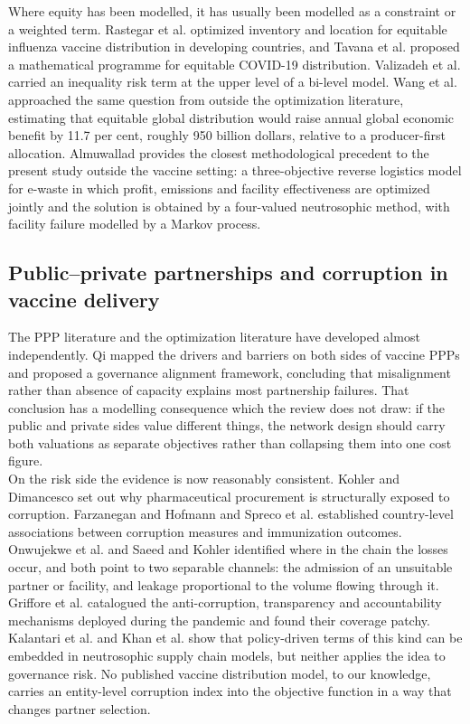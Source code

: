 \documentclass[a4paper]{elsarticle}
\begin{document}
{Where equity has been modelled, it has usually been modelled as a constraint or a weighted term. Rastegar et al. \cite{Rastegar:2021} optimized inventory and location for equitable influenza vaccine distribution in developing countries, and Tavana et al. \cite{Tavana:2021} proposed a mathematical programme for equitable COVID-19 distribution. Valizadeh et al. \cite{Valizadeh:2023} carried an inequality risk term at the upper level of a bi-level model. Wang et al. \cite{Wang:2023}  approached the same question from outside the optimization literature, estimating that equitable global distribution would raise annual global economic benefit by 11.7 per cent, roughly 950 billion dollars, relative to a producer-first allocation. Almuwallad \cite{Almuwallad:2026} provides the closest methodological precedent to the present study outside the vaccine setting: a three-objective reverse logistics model for e-waste in which profit, emissions and facility effectiveness are optimized jointly and the solution is obtained by a four-valued neutrosophic method, with facility failure modelled by a Markov process.\\
\subsection{Public--private partnerships and corruption in vaccine delivery}
\label{subsec:ppp}
The PPP literature and the optimization literature have developed almost independently. Qi \cite{Qi:2025} mapped the drivers and barriers on both sides of vaccine PPPs and proposed a governance alignment framework, concluding that misalignment rather than absence of capacity explains most partnership failures. That conclusion has a modelling consequence which the review does not draw: if the public and private sides value different things, the network design should carry both valuations as separate objectives rather than collapsing them into one cost figure.\\
On the risk side the evidence is now reasonably consistent. Kohler and Dimancesco  \cite{Kohler:2020} set out why pharmaceutical procurement is structurally exposed to corruption. Farzanegan and Hofmann  \cite{Farzanegan:2021} and Spreco et al. \cite{Spreco:2022}  established country-level associations between corruption measures and immunization outcomes. Onwujekwe et al. \cite{Onwujekwe:2023} and Saeed and Kohler \cite{Saeed:2025} identified where in the chain the losses occur, and both point to two separable channels: the admission of an unsuitable partner or facility, and leakage proportional to the volume flowing through it. Griffore et al. \cite{Griffore:2023} catalogued the anti-corruption, transparency and accountability mechanisms deployed during the pandemic and found their coverage patchy. Kalantari et al. \cite{Kalantari:2022} and Khan et al. \cite{Khan:2021}  show that policy-driven terms of this kind can be embedded in neutrosophic supply chain models, but neither applies the idea to governance risk. No published vaccine distribution model, to our knowledge, carries an entity-level corruption index into the objective function in a way that changes partner selection.\\
}
\end{document}

